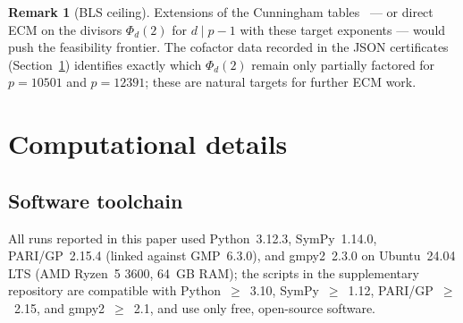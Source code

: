 \documentclass[11pt,a4paper]{amsart}
\theoremstyle{plain}
\theoremstyle{definition}
\newtheorem{remark}[theorem]{Remark}
\begin{document}
\begin{remark}[BLS ceiling]
Extensions of the Cunningham tables~\cite{Cunningham} --- or direct
ECM on the divisors $\Phi_d(2)$ for $d \mid p - 1$ with these target
exponents --- would push the feasibility frontier. The cofactor data
recorded in the JSON certificates (Section~\ref{sec:comp}) identifies
exactly which $\Phi_d(2)$ remain only partially factored for
$p = 10501$ and $p = 12391$; these are natural targets for further
ECM work.
\end{remark}

\section{Computational details}
\label{sec:comp}

\subsection{Software toolchain}

All runs reported in this paper used Python~3.12.3, SymPy~1.14.0,
PARI/GP~2.15.4 (linked against GMP~6.3.0), and gmpy2~2.3.0 on
Ubuntu~24.04 LTS (AMD Ryzen~5 3600, 64~GB RAM); the scripts in the
supplementary repository are compatible with Python~$\geq$~3.10,
SymPy~$\geq$~1.12, PARI/GP~$\geq$~2.15, and gmpy2~$\geq$~2.1, and use
only free, open-source software.
\end{document}
